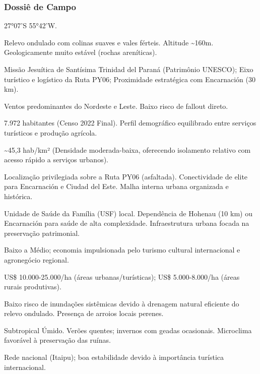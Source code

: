 \subsubsection{Dossiê de Campo}
\begin{description}[style=nextline,leftmargin=0.5cm,font=\bfseries]
\item[Coordenadas]  27°07'S 55°42'W.
\item[Topografia]  Relevo ondulado com colinas suaves e vales férteis. Altitude \textasciitilde 160m. Geologicamente muito estável (rochas areníticas).
\item[Alvos Estratégicos]  Missão Jesuítica de Santísima Trinidad del Paraná (Patrimônio UNESCO); Eixo turístico e logístico da Ruta PY06; Proximidade estratégica com Encarnación (30 km).
\item[Fallout]  Ventos predominantes do Nordeste e Leste. Baixo risco de fallout direto.
\item[População]  7.972 habitantes (Censo 2022 Final). Perfil demográfico equilibrado entre serviços turísticos e produção agrícola.
\item[Densidade]  \textasciitilde 45,3 hab/\allowbreak km² (Densidade moderada-baixa, oferecendo isolamento relativo com acesso rápido a serviços urbanos).
\item[Vias de Acesso]  Localização privilegiada sobre a Ruta PY06 (asfaltada). Conectividade de elite para Encarnación e Ciudad del Este. Malha interna urbana organizada e histórica.
\item[Serviços]  Unidade de Saúde da Família (USF) local. Dependência de Hohenau (10 km) ou Encarnación para saúde de alta complexidade. Infraestrutura urbana focada na preservação patrimonial.
\item[Custo de Vida]  Baixo a Médio; economia impulsionada pelo turismo cultural internacional e agronegócio regional.
\item[Preço da Terra]  US\$ 10.000-25.000/\allowbreak ha (áreas urbanas/\allowbreak turísticas); US\$ 5.000-8.000/\allowbreak ha (áreas rurais produtivas).
\item[Hidrologia]  Baixo risco de inundações sistêmicas devido à drenagem natural eficiente do relevo ondulado. Presença de arroios locais perenes.
\item[Clima]  Subtropical Úmido. Verões quentes; invernos com geadas ocasionais. Microclima favorável à preservação das ruínas.
\item[Energia]  Rede nacional (Itaipu); boa estabilidade devido à importância turística internacional.

\end{description}
